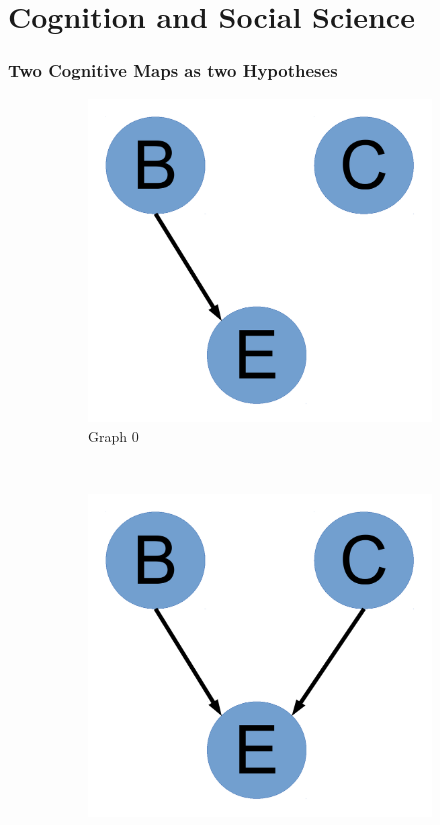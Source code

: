 \documentclass{beamer}
\begin{document}
\section{Cognition and Social Science}
\begin{frame}
\frametitle{Two Cognitive Maps as two Hypotheses}
\begin{figure}
        \centering
        \begin{subfigure}[b]{0.2\textwidth}
                \includegraphics[width=\textwidth]{Graph0.pdf}
                \caption{Graph 0}
                \label{fig:gull}
        \end{subfigure}%
        ~ %
        \begin{subfigure}[b]{0.2\textwidth}
                \includegraphics[width=\textwidth]{Graph1.pdf}

\end{subfigure}
\end{figure}
\end{frame}
\end{document}
